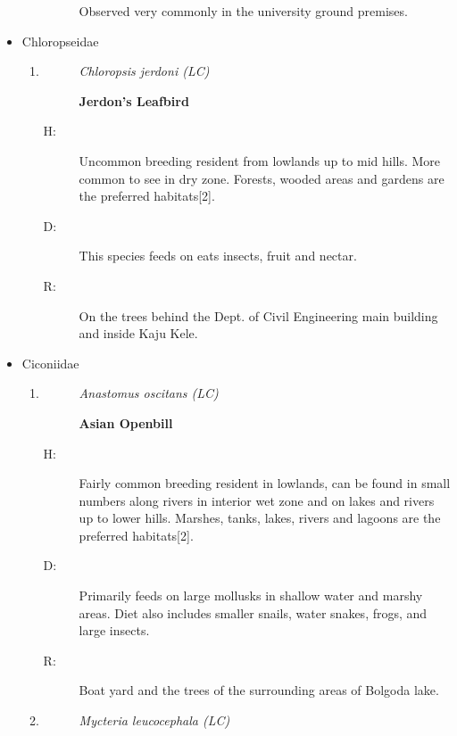 \begin{itemize}
\begin{enumerate}
\begin{description}
Observed very commonly in the university ground premises.%
\end{description}%
\end{enumerate}%
\item%
Chloropseidae%
\begin{enumerate}%
\item%
\begin{description}%
\item[]%
\textit{Chloropsis jerdoni (LC)}%
\item[]%
\textbf{Jerdon's Leafbird}%
\end{description}%
\begin{description}%
\item[H: ]%
Uncommon breeding resident from lowlands up to mid hills. More common to see in dry zone. Forests, wooded areas and gardens are the preferred habitats{[}2{]}.%
\item[D: ]%
This species feeds on eats insects, fruit and nectar. %
\item[R: ]%
On the trees behind the Dept. of Civil Engineering main building and inside Kaju Kele.%
\end{description}%
\end{enumerate}%
\item%
Ciconiidae%
\begin{enumerate}%
\item%
\begin{description}%
\item[]%
\textit{Anastomus oscitans (LC)}%
\item[]%
\textbf{Asian Openbill}%
\end{description}%
\begin{description}%
\item[H: ]%
Fairly common breeding resident in lowlands, can be found in small numbers along rivers in interior wet zone and on lakes and rivers up to lower hills. Marshes, tanks, lakes, rivers and lagoons are the preferred habitats{[}2{]}.%
\item[D: ]%
Primarily feeds on large mollusks in shallow water and marshy areas. Diet also includes smaller snails, water snakes, frogs, and large insects.%
\item[R: ]%
Boat yard and the trees of the surrounding areas of Bolgoda lake.%
\end{description}%
\item%
\begin{description}%
\item[]%
\textit{Mycteria leucocephala (LC)}%

\end{description}
\end{enumerate}
\end{itemize}
